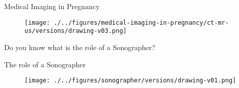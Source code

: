{
\begin{frame}{Medical Imaging in Pregnancy}
      \begin{figure}
        \centering
        \texttt{[image: ./../figures/medical-imaging-in-pregnancy/ct-mr-us/versions/drawing-v03.png]}
      \end{figure}
\end{frame}
}







{
\begin{frame}{}

\BigSizeFont
\begin{center}
    Do you know what is the role of a Sonographer?
\end{center}

\end{frame}
}



{
    \begin{frame}{The role of a Sonographer}
      \begin{figure}
        \centering
        \texttt{[image: ./../figures/sonographer/versions/drawing-v01.png]}
      \end{figure}
\end{frame}
}
